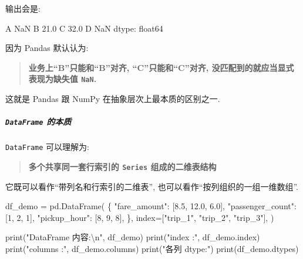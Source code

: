 \documentclass[11pt]{article}
\newenvironment{Shaded}{}{}
\newcommand{\DecValTok}[1]{\textcolor[rgb]{0.25,0.63,0.44}{{#1}}}
\newcommand{\FloatTok}[1]{\textcolor[rgb]{0.25,0.63,0.44}{{#1}}}
\newcommand{\CharTok}[1]{\textcolor[rgb]{0.25,0.44,0.63}{{#1}}}
\newcommand{\StringTok}[1]{\textcolor[rgb]{0.25,0.44,0.63}{{#1}}}
\newcommand{\NormalTok}[1]{{#1}}
\newcommand{\OperatorTok}[1]{\textcolor[rgb]{0.40,0.40,0.40}{{#1}}}
\newcommand{\BuiltInTok}[1]{{#1}}
\begin{document}
输出会是:

\begin{Shaded}
\begin{Highlighting}[]
\NormalTok{A     NaN}
\NormalTok{B    21.0}
\NormalTok{C    32.0}
\NormalTok{D     NaN}
\NormalTok{dtype: float64}
\end{Highlighting}
\end{Shaded}

因为 Pandas 默认认为:

\begin{quote}
\textbf{业务上``B''只能和``B''对齐, ``C''只能和``C''对齐,
没匹配到的就应当显式表现为缺失值 \texttt{NaN}.}
\end{quote}

这就是 Pandas 跟 NumPy 在抽象层次上最本质的区别之一.

    \subparagraph{\texorpdfstring{\texttt{DataFrame}
的本质}{DataFrame 的本质}}\label{dataframe-ux7684ux672cux8d28}

    \texttt{DataFrame} 可以理解为:

\begin{quote}
\textbf{多个共享同一套行索引的 \texttt{Series} 组成的二维表结构}
\end{quote}

它既可以看作``带列名和行索引的二维表'',
也可以看作``按列组织的一组一维数组''.

\begin{Shaded}
\begin{Highlighting}[]
\NormalTok{df\_demo }\OperatorTok{=}\NormalTok{ pd.DataFrame(}
\NormalTok{    \{}
        \StringTok{"fare\_amount"}\NormalTok{: [}\FloatTok{8.5}\NormalTok{, }\FloatTok{12.0}\NormalTok{, }\FloatTok{6.0}\NormalTok{],}
        \StringTok{"passenger\_count"}\NormalTok{: [}\DecValTok{1}\NormalTok{, }\DecValTok{2}\NormalTok{, }\DecValTok{1}\NormalTok{],}
        \StringTok{"pickup\_hour"}\NormalTok{: [}\DecValTok{8}\NormalTok{, }\DecValTok{9}\NormalTok{, }\DecValTok{8}\NormalTok{],}
\NormalTok{    \},}
\NormalTok{    index}\OperatorTok{=}\NormalTok{[}\StringTok{"trip\_1"}\NormalTok{, }\StringTok{"trip\_2"}\NormalTok{, }\StringTok{"trip\_3"}\NormalTok{],}
\NormalTok{)}

\BuiltInTok{print}\NormalTok{(}\StringTok{"DataFrame 内容:}\CharTok{\textbackslash{}n}\StringTok{"}\NormalTok{, df\_demo)}
\BuiltInTok{print}\NormalTok{(}\StringTok{"index   :"}\NormalTok{, df\_demo.index)}
\BuiltInTok{print}\NormalTok{(}\StringTok{"columns :"}\NormalTok{, df\_demo.columns)}
\BuiltInTok{print}\NormalTok{(}\StringTok{"各列 dtype:"}\NormalTok{)}
\BuiltInTok{print}\NormalTok{(df\_demo.dtypes)}
\end{Highlighting}
\end{Shaded}
\end{document}
